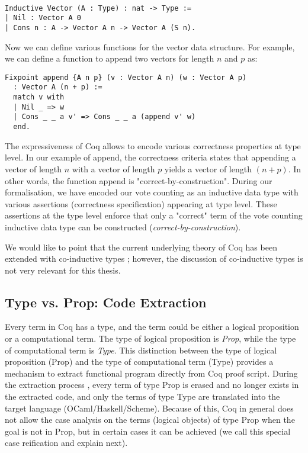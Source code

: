 \begin{verbatim}

Inductive Vector (A : Type) : nat -> Type :=
| Nil : Vector A 0
| Cons n : A -> Vector A n -> Vector A (S n).

\end{verbatim}

\noindent 
Now we can define various functions for the  vector data structure.  For example, 
we can define a function to append two vectors for length $n$ and $p$ as:

\begin{verbatim}
Fixpoint append {A n p} (v : Vector A n) (w : Vector A p)  
  : Vector A (n + p) :=
  match v with
  | Nil _ => w
  | Cons _ _ a v' => Cons _ _ a (append v' w)
  end.

\end{verbatim}
 
\noindent
The expressiveness of Coq allows to encode various correctness properties at type level. 
In our example of append, the correctness criteria states that appending a 
vector of length $n$ with a vector of length $p$ yields a vector of length $(n + p)$.  
In other words, the function append is "correct-by-construction". 
During our formalisation, we have encoded our vote counting 
as an inductive data type with various assertions (correctness specification)
appearing at type level. These assertions at the type level 
enforce that only a "correct" term of the vote counting inductive data type can be constructed
(\emph{correct-by-construction}).



We would like to point that the current underlying theory of Coq has been 
extended with co-inductive types \citep{10.1007/3-540-60579-7_3}; however, 
the discussion of co-inductive types is not very relevant for this thesis.	

 
\subsection{Type vs. Prop: Code Extraction}
\label{sec:typeprop}
 Every term in Coq has
 a type, and the term could be either a logical proposition 
 or a computational term. 
 The type of logical proposition is \textit{Prop}, while the type of 
 computational term is \textit{Type}. This distinction between 
 the type of logical proposition (Prop) and the type of computational 
 term  (Type) provides a mechanism to extract 
 functional program directly from Coq proof script.
 During the extraction process \citep{Letouzey:2008:ECO}, 
 every term of type Prop is erased and no longer exists in the extracted 
 code, and only the terms of type Type are translated into the target language
 (OCaml/Haskell/Scheme). Because of this, Coq in general does not allow
 the case analysis on
 the terms (logical objects) of type Prop  when the goal is not in Prop,
 but in certain cases it can be achieved (we call this special 
 case reification and explain next). 
 
